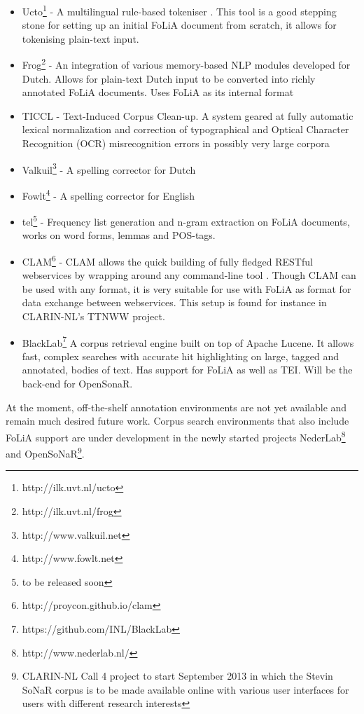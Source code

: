 \documentclass[a4paper,10pt,twoside]{article}
\begin{document}
\begin{itemize}
  \item Ucto\footnote{http://ilk.uvt.nl/ucto} - A multilingual rule-based
    tokeniser \cite{UCTO}. This tool is a good stepping stone for setting up an initial
    FoLiA document from scratch, it allows for  tokenising plain-text input.
 \item Frog\footnote{http://ilk.uvt.nl/frog} - An integration of various memory-based NLP modules developed for Dutch. Allows for plain-text Dutch input to be converted into richly
  annotated FoLiA documents. Uses FoLiA as its internal format
 \item TICCL - Text-Induced Corpus Clean-up. A system geared at fully automatic lexical normalization and correction of typographical and Optical Character Recognition (OCR) misrecognition errors in possibly very large corpora \cite{Reynaert2010}
 \item Valkuil\footnote{http://www.valkuil.net} - A spelling corrector for Dutch
 \item Fowlt\footnote{http://www.fowlt.net} - A spelling corrector for English
 \item tel\footnote{to be released soon} - Frequency list generation and n-gram
   extraction on FoLiA documents, works on word forms, lemmas and POS-tags.
 \item CLAM\footnote{http://proycon.github.io/clam} - CLAM allows the quick
   building of fully fledged RESTful webservices by wrapping around any
   command-line tool \cite{CLAM}. Though CLAM can be used with any format, it
   is very suitable
   for use with FoLiA as format for data exchange between webservices. This
   setup is found for instance in CLARIN-NL's TTNWW project. %
   \item BlackLab\footnote{https://github.com/INL/BlackLab} A corpus retrieval engine built on top of Apache Lucene. It allows fast, complex searches with accurate hit highlighting on large, tagged and annotated, bodies of text. Has support for FoLiA as well as TEI. Will be the back-end for OpenSonaR.
   \end{itemize}

At the moment, off-the-shelf annotation environments are not yet available and
remain much desired future work. Corpus search environments that also include
FoLiA support are under development in the newly started projects
NederLab\footnote{http://www.nederlab.nl/} and OpenSoNaR\footnote{CLARIN-NL
Call 4 project to start September 2013 in which the Stevin SoNaR corpus is to
be made available online with various user interfaces for users with different
research interests}. %
\end{document}
